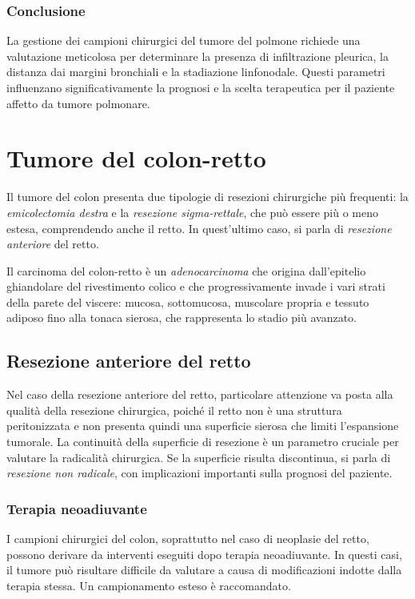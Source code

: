 \subsubsection{Conclusione}
La gestione dei campioni chirurgici del tumore del polmone richiede una valutazione meticolosa per determinare la presenza di infiltrazione pleurica, la distanza dai margini bronchiali e la stadiazione linfonodale. Questi parametri influenzano significativamente la prognosi e la scelta terapeutica per il paziente affetto da tumore polmonare.

\section{Tumore del colon-retto}
Il tumore del colon presenta due tipologie di resezioni chirurgiche più frequenti: la \textit{emicolectomia destra} e la \textit{resezione sigma-rettale}, che può essere più o meno estesa, comprendendo anche il retto. In quest'ultimo caso, si parla di \textit{resezione anteriore} del retto.

Il carcinoma del colon-retto è un \textit{adenocarcinoma} che origina dall'epitelio ghiandolare del rivestimento colico e che progressivamente invade i vari strati della parete del viscere: mucosa, sottomucosa, muscolare propria e tessuto adiposo fino alla tonaca sierosa, che rappresenta lo stadio più avanzato.

\subsection{Resezione anteriore del retto}
Nel caso della resezione anteriore del retto, particolare attenzione va posta alla qualità della resezione chirurgica, poiché il retto non è una struttura peritonizzata e non presenta quindi una superficie sierosa che limiti l'espansione tumorale. La continuità della superficie di resezione è un parametro cruciale per valutare la radicalità chirurgica. Se la superficie risulta discontinua, si parla di \textit{resezione non radicale}, con implicazioni importanti sulla prognosi del paziente.

\subsubsection{Terapia neoadiuvante}
I campioni chirurgici del colon, soprattutto nel caso di neoplasie del retto, possono derivare da interventi eseguiti dopo terapia neoadiuvante. In questi casi, il tumore può risultare difficile da valutare a causa di modificazioni indotte dalla terapia stessa. Un campionamento esteso è raccomandato. 

